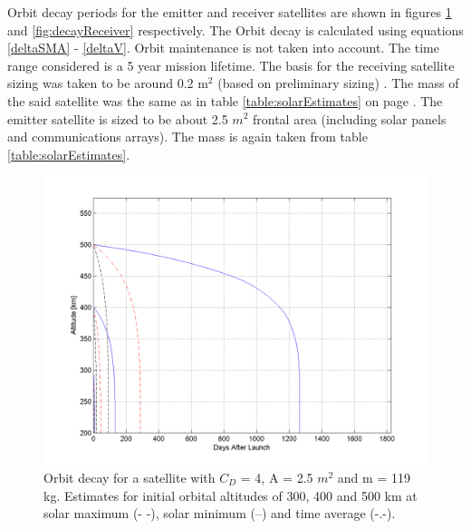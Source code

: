 Orbit decay periods for the emitter and receiver satellites are shown in figures \ref{fig:decayEmitter} and \ref{fig:decayReceiver} respectively. The Orbit decay is calculated using equations \ref{deltaSMA} - \ref{deltaV}. Orbit maintenance is not taken into account. The time range considered is a 5 year mission lifetime. The basis for the receiving satellite sizing was taken to be around 0.2 m$^2$ (based on preliminary sizing) . The mass of the said satellite was the same as in table \ref{table:solarEstimates} on page \pageref{table:solarEstimates}. The emitter satellite is sized to be about 2.5 $m^2$ frontal area (including solar panels and communications arrays). The mass is again taken from table \ref{table:solarEstimates}.

\begin{figure}[h!]
\centering
\includegraphics[width=0.95\textheight, angle=90]{chapters/img/orbitDecayEmitter.png}
\caption{Orbit decay for a satellite with $C_D$ = 4, A = 2.5 $m^2$ and m = 119 kg. Estimates for initial orbital altitudes of 300, 400 and 500 km at solar maximum (- -), solar minimum (--) and time average (-.-).}
\label{fig:decayEmitter}
\end{figure}


